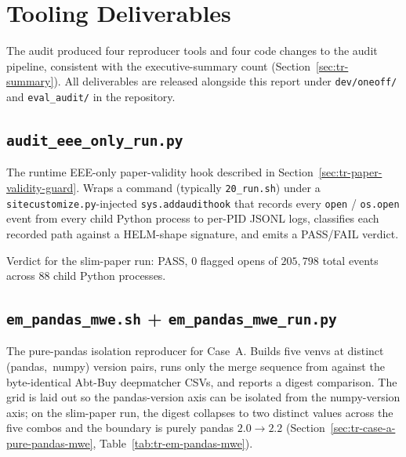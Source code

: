\documentclass[11pt]{article}
\begin{document}
\section{Tooling Deliverables}
\label{sec:tr-tooling}

The audit produced four reproducer tools and four code changes to the
  audit pipeline, consistent with the executive-summary count
  (Section~\ref{sec:tr-summary}).
All deliverables are released alongside this report under
  \texttt{dev/oneoff/} and \texttt{eval\_audit/} in the repository.

\subsection{\texorpdfstring{\texttt{audit\_eee\_only\_run.py}}{audit\_eee\_only\_run.py}}
\label{sec:tr-tooling-audit-hook}

The runtime EEE-only paper-validity hook described in
  Section~\ref{sec:tr-paper-validity-guard}.
Wraps a command (typically \texttt{20\_run.sh}) under a
  \texttt{sitecustomize.py}-injected \texttt{sys.addaudithook} that
  records every \texttt{open} / \texttt{os.open} event from every
  child Python process to per-PID JSONL logs, classifies each
  recorded path against a HELM-shape signature, and emits a
  PASS/FAIL verdict.

Verdict for the slim-paper run: PASS, $0$ flagged opens of
  $205{,}798$ total events across $88$ child Python processes.

\subsection{\texorpdfstring{\texttt{em\_pandas\_mwe.sh} + \texttt{em\_pandas\_mwe\_run.py}}{em\_pandas\_mwe.sh + em\_pandas\_mwe\_run.py}}
\label{sec:tr-tooling-em-pandas-mwe}

The pure-pandas isolation reproducer for Case~A.
Builds five venvs at distinct \mbox{(pandas, numpy)} version pairs,
  runs only the merge sequence from
   against the
  byte-identical Abt-Buy deepmatcher CSVs, and reports a digest
  comparison.
The grid is laid out so the pandas-version axis can be isolated from
  the numpy-version axis; on the slim-paper run, the digest collapses
  to two distinct values across the five combos and the boundary is
  purely pandas $2.0 \to 2.2$
  (Section~\ref{sec:tr-case-a-pure-pandas-mwe},
  Table~\ref{tab:tr-em-pandas-mwe}).
\end{document}
